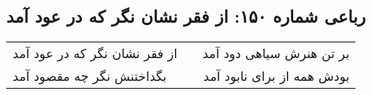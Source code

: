 \begin{center}
\section*{رباعی شماره ۱۵۰: از فقر نشان نگر که در عود آمد}
\label{sec:sh150}
\begin{longtable}{l p{0.5cm} r}
از فقر نشان نگر که در عود آمد
&&
بر تن هنرش سیاهی دود آمد
\\
بگداختنش نگر چه مقصود آمد
&&
بودش همه از برای نابود آمد
\\
\end{longtable}
\end{center}
